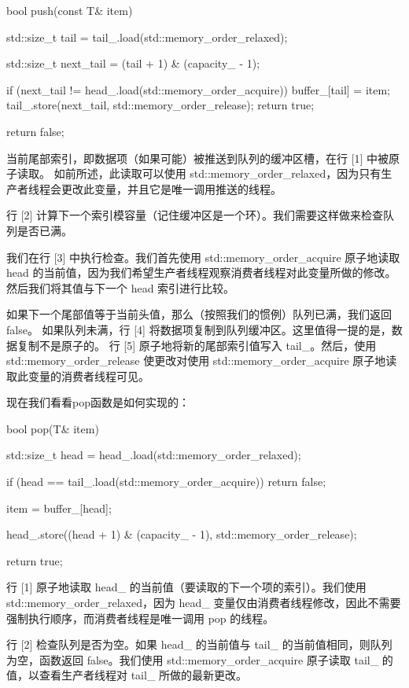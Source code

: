 \begin{cpp}
bool push(const T& item) {
    std::size_t tail =
        tail_.load(std::memory_order_relaxed);

    std::size_t next_tail =
        (tail + 1) & (capacity_ - 1);

    if (next_tail != head_.load(std::memory_order_acquire)) {
        buffer_[tail] = item;
        tail_.store(next_tail, std::memory_order_release);
        return true;
    }

    return false;
}
\end{cpp}

当前尾部索引，即数据项（如果可能）被推送到队列的缓冲区槽，在行 [1] 中被原子读取。
如前所述，此读取可以使用 std::memory\_order\_relaxed，因为只有生产者线程会更改此变量，并且它是唯一调用推送的线程。

行 [2] 计算下一个索引模容量（记住缓冲区是一个环）。我们需要这样做来检查队列是否已满。

我们在行 [3] 中执行检查。我们首先使用 std::memory\_order\_acquire 原子地读取 head 的当前值，因为我们希望生产者线程观察消费者线程对此变量所做的修改。然后我们将其值与下一个 head 索引进行比较。

如果下一个尾部值等于当前头值，那么（按照我们的惯例）队列已满，我们返回 false。
如果队列未满，行 [4] 将数据项复制到队列缓冲区。这里值得一提的是，数据复制不是原子的。
行 [5] 原子地将新的尾部索引值写入 tail\_。然后，使用 std::memory\_order\_release 使更改对使用 std::memory\_order\_acquire 原子地读取此变量的消费者线程可见。



现在我们看看pop函数是如何实现的：

\begin{cpp}
bool pop(T& item) {
    std::size_t head =
        head_.load(std::memory_order_relaxed);

    if (head == tail_.load(std::memory_order_acquire)) {
        return false;
    }

    item = buffer_[head];

    head_.store((head + 1) & (capacity_ - 1), std::memory_order_release);

    return true;
}
\end{cpp}

行 [1] 原子地读取 head\_ 的当前值（要读取的下一个项的索引）。我们使用 std::memory\_order\_relaxed，因为 head\_ 变量仅由消费者线程修改，因此不需要强制执行顺序，而消费者线程是唯一调用 pop 的线程。

行 [2] 检查队列是否为空。如果 head\_ 的当前值与 tail\_ 的当前值相同，则队列为空，函数返回 false。我们使用 std::memory\_order\_acquire 原子读取 tail\_ 的值，以查看生产者线程对 tail\_ 所做的最新更改。

